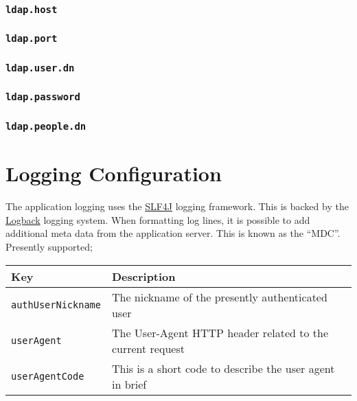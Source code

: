 \subsubsection{\tt ldap.host}
\subsubsection{\tt ldap.port}
\subsubsection{\tt ldap.user.dn}
\subsubsection{\tt ldap.password}
\subsubsection{\tt ldap.people.dn}

\section{Logging Configuration}

The application logging uses the \href{http://www.slf4j.org/}{SLF4J} logging framework.  This is backed by the \href{http://logback.qos.ch/}{Logback} logging system.  When formatting log lines, it is possible to add additional meta data from the application server.  This is known as the ``MDC''.  Presently supported;

\begin{tabular}{ | l | l | }
\hline
Key & Description \\
\hline
{\tt authUserNickname} & The nickname of the presently authenticated user \\
{\tt userAgent} & The User-Agent HTTP header related to the current request \\
{\tt userAgentCode} & This is a short code to describe the user agent in brief \\
\hline
\end{tabular}